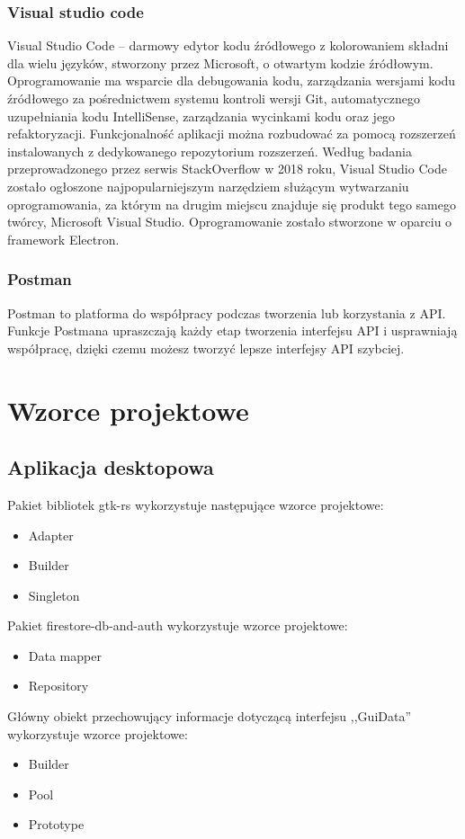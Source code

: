 \documentclass[12pt,a4paper]{article}
\begin{document}
					\subsubsection{Visual studio code}

					\indent Visual Studio Code – darmowy edytor kodu źródłowego z kolorowaniem składni dla wielu języków, stworzony przez Microsoft,
					o otwartym kodzie źródłowym. Oprogramowanie ma wsparcie dla debugowania kodu, zarządzania wersjami kodu źródłowego za pośrednictwem systemu kontroli wersji Git,
					automatycznego uzupełniania kodu IntelliSense, zarządzania wycinkami kodu oraz jego refaktoryzacji. Funkcjonalność aplikacji można rozbudować za pomocą rozszerzeń
					instalowanych z dedykowanego repozytorium rozszerzeń. Według badania przeprowadzonego przez serwis StackOverflow w 2018 roku, Visual Studio Code zostało
					ogłoszone najpopularniejszym narzędziem służącym wytwarzaniu oprogramowania, za którym na drugim miejscu znajduje się produkt tego samego twórcy,
					Microsoft Visual Studio. Oprogramowanie zostało stworzone w oparciu o framework Electron. 
					\subsubsection{Postman}
		Postman to platforma do współpracy podczas tworzenia lub korzystania z API. Funkcje Postmana upraszczają każdy etap tworzenia interfejsu API i usprawniają współpracę, dzięki czemu możesz tworzyć lepsze interfejsy API szybciej.
	\newpage
	
	\section{Wzorce projektowe}
		\subsection{Aplikacja desktopowa}

			\indent Pakiet bibliotek gtk-rs wykorzystuje następujące wzorce projektowe:
			\begin{itemize}
				\item Adapter
				\item Builder
				\item Singleton								 
			\end{itemize}

			\indent Pakiet firestore-db-and-auth wykorzystuje wzorce projektowe:
			\begin{itemize}
				\item Data mapper
				\item Repository
			\end{itemize}
			Główny obiekt przechowujący informacje dotyczącą interfejsu ,,GuiData'' wykorzystuje wzorce projektowe:
			\begin{itemize}
				\item Builder
				\item Pool
				\item Prototype
			\end{itemize}
\end{document}
